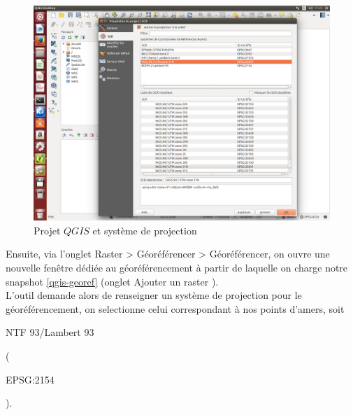 \documentclass{book}
\begin{document}
\begin{figure}[H]
\begin{center}
\includegraphics[scale=0.3]{images/georeferencing/qgis-projet.png}
\end{center}
\caption{Projet $QGIS$ et système de projection}
\label{qgis-projet}
\end{figure}

\clearpage

Ensuite, via l'onglet \og Raster > Géoréférencer > Géoréférencer\fg{}, on ouvre 
une nouvelle fen\^{e}tre dédiée au géoréférencement à partir de laquelle on charge notre snapshot \ref{qgis-georef} 
(onglet \og Ajouter un raster \fg{}).\\
L'outil demande alors de renseigner un système de projection pour le géoréférencement, on selectionne celui correspondant 
à nos points d'amers, soit \begin{itshape}NTF 93/Lambert 93\end{itshape} (\begin{itshape}EPSG:2154\end{itshape}).
\end{document}
